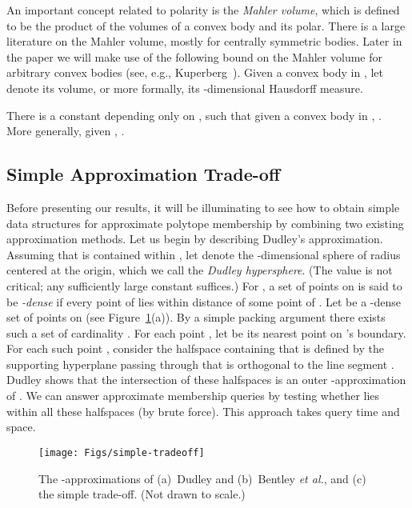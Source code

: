 \documentclass[11pt]{article}   \usepackage[letterpaper,hmargin=2.1cm,vmargin=3cm]{geometry}
\newcommand{\etal}{\textit{et al.}}
\begin{document}
An important concept related to polarity is the \emph{Mahler volume}, which is defined to be the product of the volumes of a convex body and its polar. There is a large literature on the Mahler volume, mostly for centrally symmetric bodies. Later in the paper we will make use of the following bound on the Mahler volume for arbitrary convex bodies (see, e.g., Kuperberg~\cite{Kuperberg}). Given a convex body  in , let  denote its volume, or more formally, its -dimensional Hausdorff measure.

\begin{lemma} \label{lem:mahler}
There is a constant  depending only on , such that given a convex body  in , . More generally, given , .
\end{lemma}


\subsection{Simple Approximation Trade-off} \label{sec:prelim-simple-approx}


Before presenting our results, it will be illuminating to see how to obtain simple data structures for approximate polytope membership by combining two existing approximation methods. Let us begin by describing Dudley's approximation. Assuming that  is contained within , let  denote the -dimensional sphere of radius  centered at the origin, which we call the \emph{Dudley hypersphere}. (The value  is not critical; any sufficiently large constant suffices.) For , a set  of points on  is said to be \emph{-dense} if every point of  lies within distance  of some point of . Let  be a -dense set of points on  (see Figure~\ref{fig:dudley-bentley}(a)). By a simple packing argument there exists such a set of cardinality . For each point , let  be its nearest point on 's boundary. For each such point , consider the halfspace containing  that is defined by the supporting hyperplane passing through  that is orthogonal to the line segment . Dudley shows that the intersection of these halfspaces is an outer -approximation of . We can answer approximate membership queries by testing whether  lies within all these halfspaces (by brute force). This approach takes  query time and space.

\begin{figure}[htbp]
  \centerline{\texttt{[image: Figs/simple-tradeoff]}}
  \caption{The -approximations of (a)~Dudley and (b)~Bentley {\etal}, and (c) the simple trade-off. (Not drawn to scale.)}
  \label{fig:dudley-bentley}
\end{figure}
\end{document}
